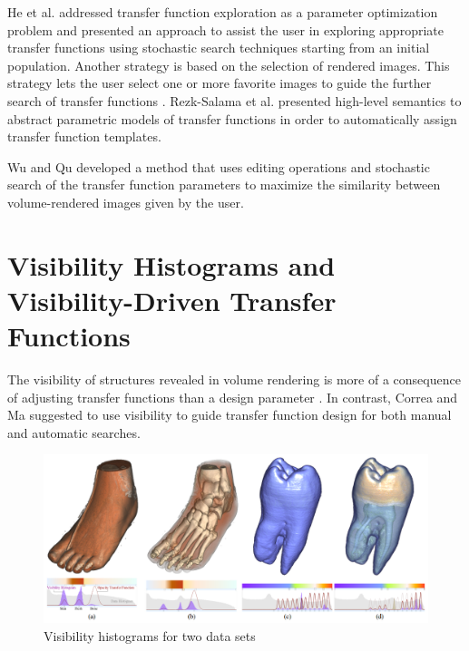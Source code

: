 He et al. \cite{he_generation_1996} addressed transfer function exploration as a parameter optimization problem and presented an approach to assist the user in exploring appropriate transfer functions using stochastic search techniques starting from an initial population.
Another strategy is based on the selection of rendered images. This strategy lets the user select one or more favorite images to guide the further search of transfer functions \cite{marks_design_1997}.
Rezk-Salama et al. \cite{rezk-salama_automatic_2000} presented high-level semantics to abstract parametric models of transfer functions in order to automatically assign transfer function templates.


\cite{tzeng_novel_2003}
\cite{tzeng_cluster-space_2004}
\cite{tzeng_intelligent_2005}

\cite{jani_opacity_2005}

Wu and Qu \cite{wu_interactive_2007} developed a method that uses editing operations and stochastic search of the transfer function parameters to maximize the similarity between volume-rendered images given by the user.

\cite{peng_optimal_2011}
\cite{lathen_automatic_2012}

\cite{woo_feature-driven_2012}


\section{Visibility Histograms and Visibility-Driven Transfer Functions}
The visibility of structures revealed in volume rendering is more of a consequence of adjusting transfer functions than a design parameter \cite{preim_visual_2013}. In contrast, Correa and Ma \cite{correa_visibility-driven_2009} suggested to use visibility to guide transfer function design for both manual and automatic searches.

\begin{figure}
\centering
\includegraphics[width=1\linewidth]{images/correa_visibility-driven_2009}
\caption{Visibility histograms for two data sets \cite{correa_visibility-driven_2009}}
\label{fig:correa_visibility-driven_2009}
\end{figure}

